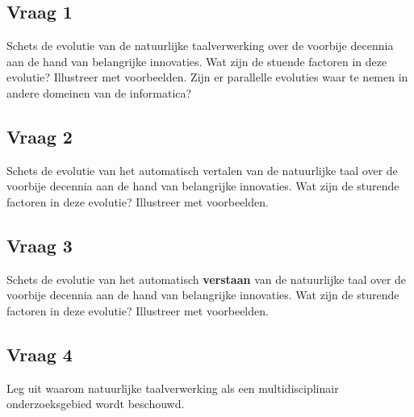 \documentclass[../main.tex]{subfiles}
\begin{document}
\subsection{Vraag 1}
\begin{question}
Schets de evolutie van de natuurlijke taalverwerking over de voorbije decennia aan de hand van belangrijke innovaties. Wat zijn de stuende factoren in deze evolutie? Illustreer met voorbeelden.
Zijn er parallelle evoluties waar te nemen in andere domeinen van de informatica?
\end{question}

\begin{solution}

\end{solution}

\subsection{Vraag 2}
\begin{question}
Schets de evolutie van het automatisch vertalen van de natuurlijke taal over de voorbije decennia aan de hand van belangrijke innovaties. Wat zijn de sturende factoren in deze evolutie? Illustreer met voorbeelden.
\end{question}

\begin{solution}

\end{solution}

\subsection{Vraag 3}
\begin{question}
Schets de evolutie van het automatisch \textbf{verstaan} van de natuurlijke taal over de voorbije decennia aan de hand van belangrijke innovaties. Wat zijn de sturende factoren in deze evolutie? Illustreer met voorbeelden.
\end{question}

\begin{solution}

\end{solution}

\subsection{Vraag 4}
\begin{question}
Leg uit waarom natuurlijke taalverwerking als een multidisciplinair onderzoeksgebied wordt beschouwd.
\end{question}
\end{document}
